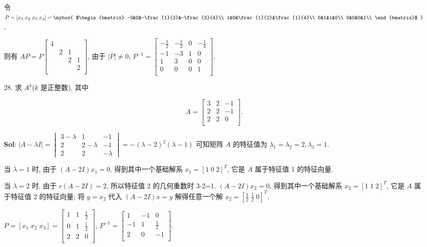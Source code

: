 令 $P=[x_1\;x_2\;x_3\;x_4]
=\mybox{
$\begin{bmatrix}
    -3&0&-\frac{1}{2}&-\frac{3}{4}\\
    1&0&\frac{1}{2}&\frac{1}{4}\\
    0&1&1&0\\
    0&0&0&1\\
\end{bmatrix}$
}$, 

则有 $AP=P\begin{bmatrix}
    4&&&\\
    &2&1&\\
    &&2&1\\
    &&&2\\
\end{bmatrix}$, 由于 $|P|\not=0$, $P^{-1}=\begin{bmatrix}
    -\frac{1}{2}&-\frac{1}{2}&0&-\frac{1}{4}\\
    -1&-3&1&0\\
    1&3&0&0\\
    0&0&0&1\\
\end{bmatrix}$.


\vspace{12pt}

28. 求 $A^k$($k$ 是正整数), 其中

$$
A=
\begin{bmatrix}
    3&2&-1\\
    2&2&-1\\
    2&2&0\\
\end{bmatrix}.
$$

\textbf{Sol}: $|A-\lambda I|=\begin{vmatrix}
    3-\lambda&1&-1\\
    2&2-\lambda&-1\\
    2&2&-\lambda
\end{vmatrix}=-(\lambda-2)^2(\lambda-1)$ 可知矩阵 $A$ 的特征值为 $\lambda_1=\lambda_2=2,\lambda_3=1$.

当 $\lambda=1$ 时, 由于 $(A-2I)x_1=0$, 得到其中一个基础解系 $x_1=[1\;0\;2]^T$, 它是 $A$ 属于特征值 1 的特征向量.

当 $\lambda=2$ 时, 由于 $r(A-2I)=2$, 所以特征值 2 的几何重数时 3-2=1. $(A-2I)x_2=0$, 得到其中一个基础解系 $x_2=[1\;1\;2]^T$, 它是 $A$ 属于特征值 2 的特征向量; 将 $y=x_2$ 代入 $(A-2I)x=y$ 解得任意一个解 $x_2=[\frac{1}{2}\;\frac{1}{2}\;0]^T$. 

$P=[x_1\;x_2\;x_3]=\begin{bmatrix}
    1&1&\frac{1}{2}\\
    0&1&\frac{1}{2}\\
    2&2&0\\
\end{bmatrix}$, $P^{-1}=\begin{bmatrix}
    1&-1&0\\
    -1&1&\frac{1}{2}\\
    2&0&-1\\
\end{bmatrix}$.

